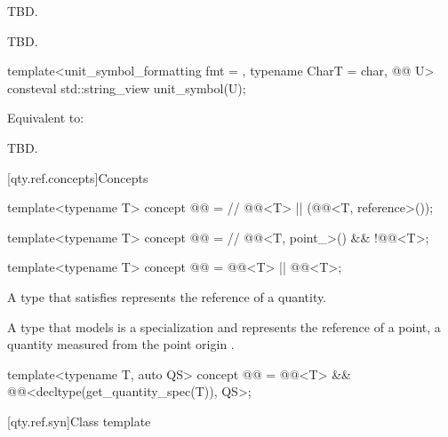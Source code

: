 \begin{itemdescr}
\pnum
\effects
TBD.

\pnum
\returns
TBD.
\end{itemdescr}

\begin{itemdecl}
template<unit_symbol_formatting fmt = {}, typename CharT = char, @@ U>
consteval std::string_view unit_symbol(U);
\end{itemdecl}

\begin{itemdescr}
\pnum
\effects
Equivalent to:
\begin{codeblock}
TBD.
\end{codeblock}
\end{itemdescr}

[qty.ref.concepts]{Concepts}

\begin{itemdecl}
template<typename T>
concept @@ =   // \expos
  @@<T> || (@@<T, reference>());

template<typename T>
concept @@ =  // \expos
  @@<T, point_>() && !@@<T>;

template<typename T>
concept @@ = @@<T> || @@<T>;
\end{itemdecl}

\pnum
A type  that satisfies 
represents the reference of a quantity.

\pnum
A type that models  is a specialization 
and represents the reference of a point,
a quantity measured from the point origin .

\begin{itemdecl}
template<typename T, auto QS>
concept @@ = @@<T> && @@<decltype(get_quantity_spec(T{})), QS>;
\end{itemdecl}

[qty.ref.syn]{Class template }

